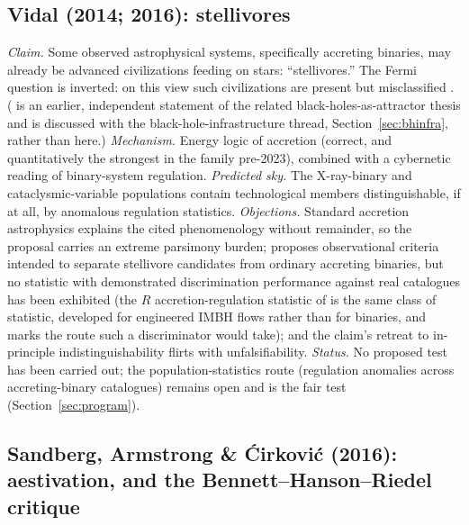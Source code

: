 \documentclass[11pt]{article}
\begin{document}
\subsection{Vidal (2014; 2016): stellivores}

\emph{Claim.} Some observed astrophysical systems, specifically accreting binaries, may already be advanced civilizations feeding on stars: ``stellivores.'' The Fermi question is inverted: on this view such civilizations are present but misclassified \citep{Vidal2014,Vidal2016}. (\citealt{Vidal2011} is an earlier, independent statement of the related black-holes-as-attractor thesis and is discussed with the black-hole-infrastructure thread, Section~\ref{sec:bhinfra}, rather than here.)
\emph{Mechanism.} Energy logic of accretion (correct, and quantitatively the strongest in the family pre-2023), combined with a cybernetic reading of binary-system regulation.
\emph{Predicted sky.} The X-ray-binary and cataclysmic-variable populations contain technological members distinguishable, if at all, by anomalous regulation statistics.
\emph{Objections.} Standard accretion astrophysics explains the cited phenomenology without remainder, so the proposal carries an extreme parsimony burden; \citet{Vidal2016} proposes observational criteria intended to separate stellivore candidates from ordinary accreting binaries, but no statistic with demonstrated discrimination performance against real catalogues has been exhibited (the $R$ accretion-regulation statistic of \citealt{Swanson2026Engineered} is the same class of statistic, developed for engineered IMBH flows rather than for binaries, and marks the route such a discriminator would take); and the claim's retreat to in-principle indistinguishability flirts with unfalsifiability.
\emph{Status.} No proposed test has been carried out; the population-statistics route (regulation anomalies across accreting-binary catalogues) remains open and is the fair test (Section~\ref{sec:program}).

\subsection{Sandberg, Armstrong \& \'Cirkovi\'c (2016): aestivation, and the Bennett--Hanson--Riedel critique}
\label{sec:aestivation}
\end{document}
